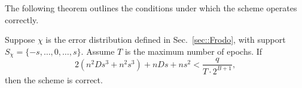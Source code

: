 \documentclass{fundam}
\begin{document}
The following theorem outlines the conditions under which the scheme operates correctly.
\begin{theorem}\label{th::06::03}
	Suppose $\chi$ is the error distribution defined in Sec.~\ref{sec::Frodo}, with support $S_{\chi} = \{ -s, \ldots, 0, \ldots, s \}$. Assume $T$ is the maximum number of epochs. If
	\[
	2(n^{2}Ds^{3} + n^{2}s^{3}) + nDs + ns^{2} < \frac{q}{T \cdot 2^{B+1}},
	\]
	then the scheme is correct.
\end{theorem}
\end{document}
